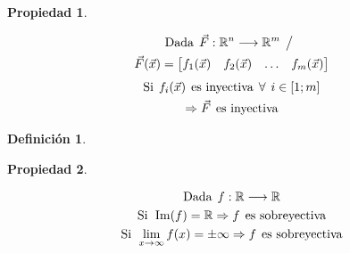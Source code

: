\documentclass[a5paper,12pt,twoside]{book}
\newtheorem{defn}{{Definición}}[chapter]
\newtheorem{prop}{{Propiedad}}[chapter]
\begin{document}
\begin{mdframed}[style=MyFrame1]
    \begin{prop}
    \end{prop}
    \begin{multline*}
        \textrm{Dada} \hspace{1ex} \Vec{F}: \mathbb{R}^n \longrightarrow \mathbb{R}^m \hspace{1ex} \big/ \hspace{1ex}
        \\
        \Vec{F}(\Vec{x}) = \begin{bmatrix} f_1(\Vec{x}) & f_2(\Vec{x}) & \ldots & f_m(\Vec{x}) \end{bmatrix}
    \end{multline*}
    \begin{gather*}
        \textrm{Si} \hspace{1ex} f_i(\Vec{x}) \hspace{1ex} \textrm{es inyectiva} \hspace{1ex} \forall \hspace{1ex} i \in [1;m]
        \\
        \Rightarrow \Vec{F} \hspace{1ex} \textrm{es inyectiva}
    \end{gather*}
\end{mdframed}

\begin{mdframed}[style=MyFrame1]
    \begin{defn}
    \end{defn}
\end{mdframed}

\begin{mdframed}[style=MyFrame1]
    \begin{prop}
    \end{prop}
    \begin{gather*}
        \textrm{Dada} \hspace{1ex} f: \mathbb{R} \longrightarrow \mathbb{R}
        \\
        \textrm{Si} \hspace{1ex} \operatorname{Im}(f) = \mathbb{R}
        \Rightarrow f \hspace{1ex} \textrm{es sobreyectiva}
        \\
        \textrm{Si} \hspace{1ex} \lim_{x \to \infty} f(x) = \pm \infty
        \Rightarrow f \hspace{1ex} \textrm{es sobreyectiva}
    \end{gather*}
\end{mdframed}
\end{document}
